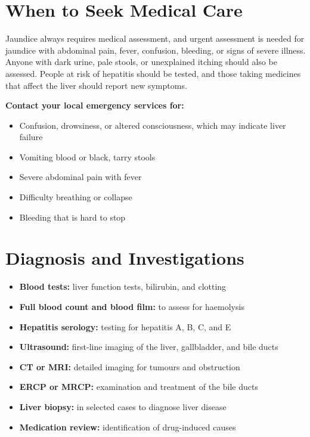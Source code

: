 \section*{When to Seek Medical Care}
Jaundice always requires medical assessment, and urgent assessment is needed for jaundice with abdominal pain, fever, confusion, bleeding, or signs of severe illness. Anyone with dark urine, pale stools, or unexplained itching should also be assessed. People at risk of hepatitis should be tested, and those taking medicines that affect the liver should report new symptoms.

\textbf{Contact your local emergency services for:}
\begin{itemize}
    \item Confusion, drowsiness, or altered consciousness, which may indicate liver failure
    \item Vomiting blood or black, tarry stools
    \item Severe abdominal pain with fever
    \item Difficulty breathing or collapse
    \item Bleeding that is hard to stop
\end{itemize}

\section*{Diagnosis and Investigations}
\begin{itemize}
    \item \textbf{Blood tests:} liver function tests, bilirubin, and clotting
    \item \textbf{Full blood count and blood film:} to assess for haemolysis
    \item \textbf{Hepatitis serology:} testing for hepatitis A, B, C, and E
    \item \textbf{Ultrasound:} first-line imaging of the liver, gallbladder, and bile ducts
    \item \textbf{CT or MRI:} detailed imaging for tumours and obstruction
    \item \textbf{ERCP or MRCP:} examination and treatment of the bile ducts
    \item \textbf{Liver biopsy:} in selected cases to diagnose liver disease
    \item \textbf{Medication review:} identification of drug-induced causes
\end{itemize}

